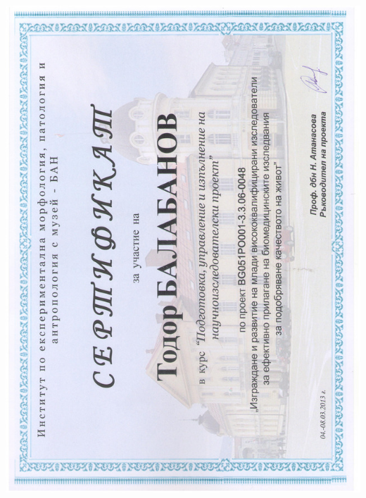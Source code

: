 \documentclass[english,a4paper]{europasscv}
\begin{document}
\includegraphics[width=\textwidth,height=\textheight,keepaspectratio]{IEMPAM2013_3}
\end{document}
